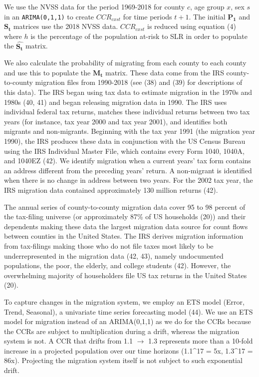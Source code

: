 \documentclass[9pt,twocolumn,twoside,]{pnas-new}
\begin{document}
We use the NVSS data for the period 1969-2018 for county \(c\), age
group \(x\), sex \(s\) in an \texttt{ARIMA(0,1,1)} to create
\(CCR_{cxst}\) for time periods \(t+1\). The initial \(\mathbf{P_1}\)
and \(\mathbf{S_t}\) matrices use the 2018 NVSS data. \(CCR_{cxst}\) is
reduced using equation (4) where \(h\) is the percentage of the
population at-risk to SLR in order to populate the
\(\mathbf{\hat{S_t}}\) matrix.

We also calculate the probability of migrating from each county to each
county and use this to populate the \(\mathbf{M_t}\) matrix. These data
come from the IRS county-to-county migration files from 1990-2018 (see
(38) and (39) for descriptions of this data). The IRS began using tax
data to estimate migration in the 1970s and 1980s (40, 41) and began
releasing migration data in 1990. The IRS uses individual federal tax
returns, matches these individual returns between two tax years (for
instance, tax year 2000 and tax year 2001), and identifies both migrants
and non-migrants. Beginning with the tax year 1991 (the migration year
1990), the IRS produces these data in conjunction with the US Census
Bureau using the IRS Individual Master File, which contains every Form
1040, 1040A, and 1040EZ (42). We identify migration when a current
years' tax form contains an address different from the preceding years'
return. A non-migrant is identified when there is no change in address
between two years. For the 2002 tax year, the IRS migration data
contained approximately 130 million returns (42).

The annual series of county-to-county migration data cover 95 to 98
percent of the tax-filing universe (or approximately 87\% of US
households (20)) and their dependents making these data the largest
migration data source for count flows between counties in the United
States. The IRS derives migration information from tax-filings making
those who do not file taxes most likely to be underrepresented in the
migration data (42, 43), namely undocumented populations, the poor, the
elderly, and college students (42). However, the overwhelming majority
of householders file US tax returns in the United States (20).

To capture changes in the migration system, we employ an ETS model
(Error, Trend, Seasonal), a univariate time series forecasting model
(44). We use an ETS model for migration instead of an ARIMA(0,1,1) as we
do for the CCRs because the CCRs are subject to multiplication during a
drift, whereas the migration system is not. A CCR that drifts from 1.1
\(\rightarrow\) 1.3 represents more than a 10-fold increase in a
projected population over our time horizons (1.1\^{}17 = 5x, 1.3\^{}17 =
86x). Projecting the migration system itself is not subject to such
exponential drift.
\end{document}
